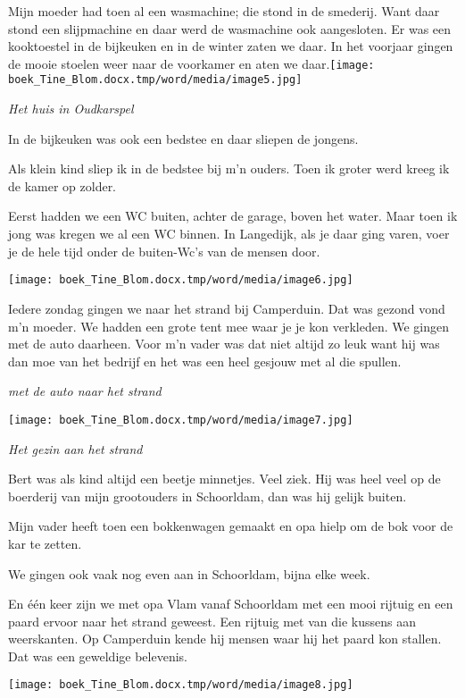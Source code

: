 \documentclass{scrbook}
\begin{document}
Mijn moeder had toen al een wasmachine; die stond in de smederij. Want daar stond een slijpmachine en daar werd de wasmachine ook aangesloten. Er was een kooktoestel in de bijkeuken en in de winter zaten we daar. In het voorjaar gingen de mooie stoelen weer naar de voorkamer en aten we daar.\texttt{[image: boek\_Tine\_Blom.docx.tmp/word/media/image5.jpg]}

\textit{Het huis in Oudkarspel}

In de bijkeuken was ook een bedstee en daar sliepen de jongens.

Als klein kind sliep ik in de bedstee bij m’n ouders. Toen ik groter werd kreeg ik de kamer op zolder.

Eerst hadden we een WC buiten, achter de garage, boven het water. Maar toen ik jong was kregen we al
een WC binnen. In Langedijk, als je daar ging varen, voer je de hele tijd onder de buiten-Wc's van de mensen door.

\texttt{[image: boek\_Tine\_Blom.docx.tmp/word/media/image6.jpg]}

Iedere zondag gingen we naar het strand bij Camperduin. Dat was gezond vond m’n moeder.
We hadden een grote tent mee waar je je kon verkleden. We gingen met de auto daarheen. Voor m’n vader was dat niet altijd zo leuk want hij was dan moe van het bedrijf en het was een heel gesjouw met al die spullen.

\textit{met de auto naar het strand}

\texttt{[image: boek\_Tine\_Blom.docx.tmp/word/media/image7.jpg]}

\textit{Het gezin aan het strand}

Bert was als kind altijd een beetje minnetjes. Veel ziek. Hij was heel veel op de boerderij van mijn grootouders in Schoorldam, dan was hij gelijk buiten. 

Mijn vader heeft toen een bokkenwagen gemaakt en opa hielp om de bok voor de kar te zetten.

We gingen ook vaak nog even aan in Schoorldam, bijna elke week.

En \'{e}\'{e}n keer zijn we met opa Vlam vanaf Schoorldam met een mooi rijtuig en een paard ervoor naar het strand geweest. Een rijtuig met van die kussens aan weerskanten. Op Camperduin kende hij mensen waar hij het paard kon stallen. Dat was een geweldige belevenis.

\texttt{[image: boek\_Tine\_Blom.docx.tmp/word/media/image8.jpg]}
\end{document}
